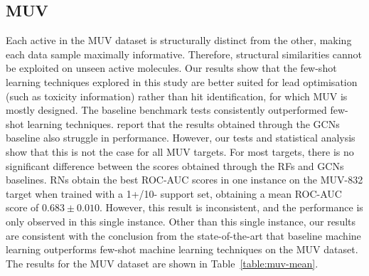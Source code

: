 \subsection{MUV}

Each active in the MUV dataset is structurally distinct from the other, making each data sample maximally informative. Therefore, structural similarities cannot be exploited on unseen active molecules. Our results show that the few-shot learning techniques explored in this study are better suited for lead optimisation (such as toxicity information) rather than hit identification, for which MUV is mostly designed. The baseline benchmark tests consistently outperformed few-shot learning techniques. \citet{altae2017low} report that the results obtained through the GCNs baseline also struggle in performance. However, our tests and statistical analysis show that this is not the case for all MUV targets. For most targets, there is no significant difference between the scores obtained through the RFs and GCNs baselines. RNs obtain the best ROC-AUC scores in one instance on the MUV-832 target when trained with a 1+/10- support set, obtaining a mean ROC-AUC score of $0.683 \pm 0.010$. However, this result is inconsistent, and the performance is only observed in this single instance. Other than this single instance, our results are consistent with the conclusion from the state-of-the-art that baseline machine learning outperforms few-shot machine learning techniques on the MUV dataset. The results for the MUV dataset are shown in Table~\ref{table:muv-mean}. 

